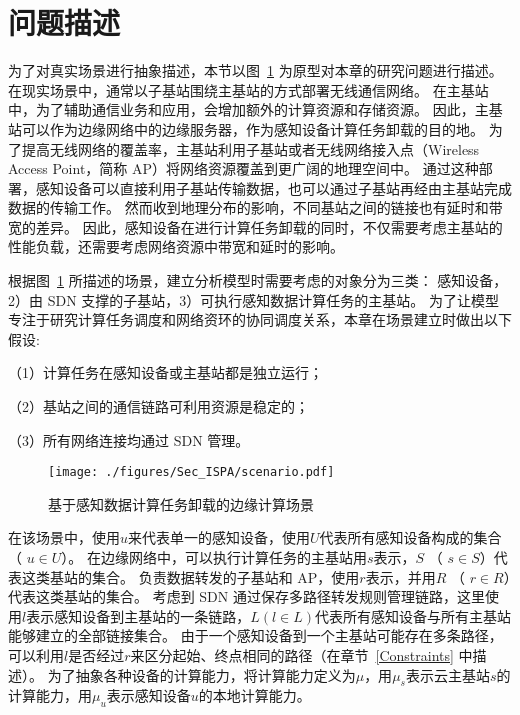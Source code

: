 \section{问题描述}

为了对真实场景进行抽象描述，本节以图~\ref{fig_scenario} 为原型对本章的研究问题进行描述。
在现实场景中，通常以子基站围绕主基站的方式部署无线通信网络。
在主基站中，为了辅助通信业务和应用，会增加额外的计算资源和存储资源。
因此，主基站可以作为边缘网络中的边缘服务器，作为感知设备计算任务卸载的目的地。
为了提高无线网络的覆盖率，主基站利用子基站或者无线网络接入点（Wireless Access Point，简称 AP）将网络资源覆盖到更广阔的地理空间中。
通过这种部署，感知设备可以直接利用子基站传输数据，也可以通过子基站再经由主基站完成数据的传输工作。
然而收到地理分布的影响，不同基站之间的链接也有延时和带宽的差异。
因此，感知设备在进行计算任务卸载的同时，不仅需要考虑主基站的性能负载，还需要考虑网络资源中带宽和延时的影响。

根据图~\ref{fig_scenario} 所描述的场景，建立分析模型时需要考虑的对象分为三类：
感知设备，2）由 SDN 支撑的子基站，3）可执行感知数据计算任务的主基站。
为了让模型专注于研究计算任务调度和网络资环的协同调度关系，本章在场景建立时做出以下假设: 

（1）计算任务在感知设备或主基站都是独立运行；

（2）基站之间的通信链路可利用资源是稳定的；

（3）所有网络连接均通过 SDN 管理。

\begin{figure}[!h]
  \centering
  \texttt{[image: ./figures/Sec\_ISPA/scenario.pdf]}
  \vspace{-1em}
  \caption{基于感知数据计算任务卸载的边缘计算场景}
  \label{fig_scenario}
\end{figure}


在该场景中，使用$u$来代表单一的感知设备，使用$U$代表所有感知设备构成的集合（ $ u \in U $）。
在边缘网络中，可以执行计算任务的主基站用$s$表示，$S$ （ $ s \in S $）代表这类基站的集合。
负责数据转发的子基站和 AP，使用$r$表示，并用$R$ （ $ r \in R $）代表这类基站的集合。
考虑到 SDN 通过保存多路径转发规则管理链路，这里使用$l$表示感知设备到主基站的一条链路，$ L ( l \in L ) $代表所有感知设备与所有主基站能够建立的全部链接集合。
由于一个感知设备到一个主基站可能存在多条路径，可以利用$l$是否经过$r$来区分起始、终点相同的路径（在章节~\ref{Constraints} 中描述）。
为了抽象各种设备的计算能力，将计算能力定义为$\mu$，用$\mu_s$表示云主基站$s$的计算能力，用$\mu_u$表示感知设备$u$的本地计算能力。

